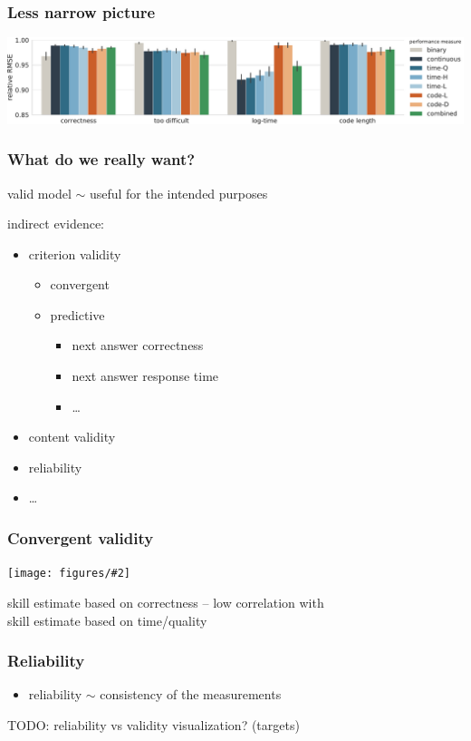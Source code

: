 \documentclass[bigger]{beamer}
\newcommand{\img}[2]{
  \begin{center}
    \texttt{[image: figures/\#2]}
  \end{center}
}
\begin{document}
\begin{frame}
  \frametitle{Less narrow picture}
  \hspace*{-0.65cm}
  \includegraphics[width=1.1\linewidth]{figures/predictive-validity}
\end{frame}


\begin{frame}
  \frametitle{What do we really want?}
  valid model $\sim$ useful for the intended purposes
  \pause

  \medskip
  indirect evidence:
  \vspace{-0.1cm}
  \begin{itemize}
    \item criterion validity
    \begin{itemize}
      \item convergent
      \item predictive
      \begin{itemize}
        \item \alert{next answer correctness}
        \item next answer response time
        \item \ldots
      \end{itemize}
    \end{itemize}
    \item content validity
    \item reliability
    \item \ldots
  \end{itemize}
\end{frame}


\begin{frame}
  \frametitle{Convergent validity}
  \bigskip
  \img{0.5}{convergent-validity}
  skill estimate based on correctness -- low correlation with\\
  skill estimate based on time/quality
\end{frame}


\begin{frame}
  \frametitle{Reliability}
  \begin{itemize}
    \item reliability $\sim$ consistency of the measurements
  \end{itemize}
  TODO: reliability vs validity visualization? (targets)
\end{frame}
\end{document}
